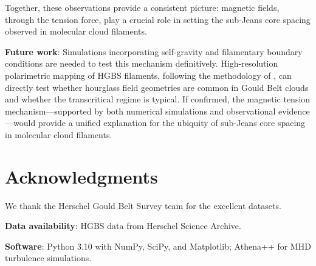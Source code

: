 \documentclass[11pt,a4paper]{article}
\begin{document}
Together, these observations provide a consistent picture: magnetic fields, through the tension force, play a crucial role in setting the sub-Jeans core spacing observed in molecular cloud filaments.

\textbf{Future work}: Simulations incorporating self-gravity and filamentary boundary conditions are needed to test this mechanism definitively. High-resolution polarimetric mapping of HGBS filaments, following the methodology of \citet{Jadhav2026}, can directly test whether hourglass field geometries are common in Gould Belt clouds and whether the transcritical regime is typical. If confirmed, the magnetic tension mechanism—supported by both numerical simulations and observational evidence—would provide a unified explanation for the ubiquity of sub-Jeans core spacing in molecular cloud filaments.

\section*{Acknowledgments}

We thank the Herschel Gould Belt Survey team for the excellent datasets.

\textbf{Data availability}: HGBS data from Herschel Science Archive.

\textbf{Software}: Python 3.10 with NumPy, SciPy, and Matplotlib; Athena++ \citep{Stone2020} for MHD turbulence simulations.



\end{document}
